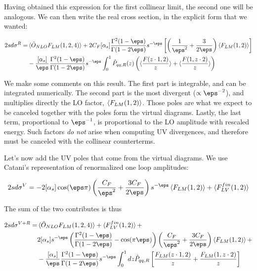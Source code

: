 \documentclass[11pt]{report}
\begin{document}
Having obtained this expression for the first collinear limit, the second one will be analogous. We can then write the real cross section, in the explicit form that we wanted: 

\begin{align}
    2sd\sigma^{R} = &\braket{\hat{O}_{NLO}F_{LM}(1, 2, 4)} + 2C_F[\alpha_s]\frac{\Gamma^2(1-\eps)}{\Gamma(1-2\eps)}s^{-\eps}\left[ \left(\frac{1}{\eps^2} +\frac{3}{2\eps} \right)\braket{F_{LM}(1, 2)}\right] \notag \\ 
    &-\frac{[\alpha_s]}{\eps}\frac{\Gamma^2(1-\eps)}{\Gamma(1-2\eps)}s^{-\eps}\int_0^1 \hat{P}_{qq, R}(z)\left(\braket{\frac{F(z\cdot 1, 2)}{z}} + \braket{\frac{F(1, z\cdot 2)}{z}}  \right)
\end{align}

We make some comments on this result. The first part is integrable, and can be integrated numerically. The second part is the most divergent (\(\propto \eps^{-2}\)), and multiplies directly the LO factor, \(\braket{F_{LM}(1, 2)}\). Those poles are what we expect to be canceled together with the poles form the virtual diagrams. Lastly, the last term, proportional to \(\eps^{-1}\), is proportional to the LO amplitude with rescaled energy. Such factors \emph{do not} arise when computing UV divergences, and therefore must be canceled with the collinear counterterms. 

Let's now add the UV poles that come from the virtual diagrams. We use Catani's representation of renormalized one loop amplitudes: 

\begin{align}
    2sd\sigma^{V} = -2[\alpha_s]\cos(\eps \pi)\left( \frac{C_F}{\eps^2}+\frac{3C_F}{2\eps} \right)s^{-\eps}\braket{F_{LM}(1, 2)} + \braket{F_{LV}^{fin}(1, 2)}
\end{align}

The sum of the two contributes is thus 

\begin{align}
    2sd\sigma^{V+R} = &\braket{\hat{O}_{NLO}F_{LM}(1, 2, 4)} + \braket{F_{LV}^{fin}(1, 2)} + \notag \\
    &2[\alpha_s]s^{-\eps}\left( \frac{\Gamma^2(1-\eps)}{\Gamma(1-2\eps)} -\cos(\pi\eps)\right)\left( \frac{C_F}{\eps^2} +\frac{3C_F}{2\eps}\right)\braket{F_{LM}(1, 2)} + \notag \\ 
    &- \frac{[\alpha_s]}{\eps}\frac{\Gamma^2(1-\eps)}{\Gamma(1-2\eps)}s^{-\eps}\int_0^1 dz \hat{P}_{qq, R}\left[\frac{F_{LM}(z\cdot1, 2)}{z} + \frac{F_{LM}(1, z\cdot 2)}{z}  \right]
\end{align}
\end{document}
